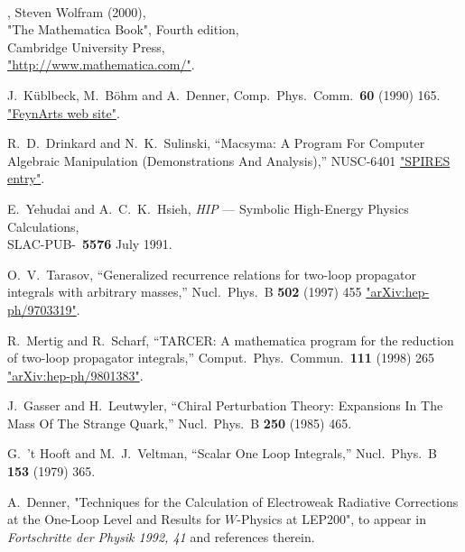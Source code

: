 
~\vspace{3cm}

\begin{thebibliography}{99}

,
Steven Wolfram (2000), \\
"The Mathematica Book", Fourth edition, \\
Cambridge University Press, \\
\href{http://www.mathematica.com/}{"http://www.mathematica.com/"}.

 J.~K\"ublbeck, M.~B\"ohm and A.~Denner, 
Comp.~Phys.~Comm.~{\bf 60} (1990) 165.\\
\href{http://www.feynarts.de/}{"FeynArts web site"}.

R.~D.~Drinkard and N.~K.~Sulinski,
``Macsyma: A Program For Computer Algebraic Manipulation (Demonstrations And Analysis),''
NUSC-6401
\href{http://www.slac.stanford.edu/spires/find/hep/www?r=nusc-6401}{"SPIRES entry"}.

E.~Yehudai and A.~C.~K.~Hsieh,
{\sl HIP\/} --- Symbolic  High-Energy Physics Calculations, \\
SLAC-PUB-~{\bf 5576} July 1991.

O.~V.~Tarasov,
``Generalized recurrence relations for two-loop propagator integrals with  arbitrary masses,''
Nucl.\ Phys.\ B {\bf 502} (1997) 455
\href{http://xxx.lanl.gov/abs/hep-ph/9703319}{"arXiv:hep-ph/9703319"}.

R.~Mertig and R.~Scharf,
``TARCER: A mathematica program for the reduction of two-loop propagator  integrals,''
Comput.\ Phys.\ Commun.\  {\bf 111} (1998) 265
\href{http://xxx.lanl.gov/abs/hep-ph/9801383}{"arXiv:hep-ph/9801383"}.

J.~Gasser and H.~Leutwyler,
``Chiral Perturbation Theory: Expansions In The Mass Of The Strange Quark,''
Nucl.\ Phys.\ B {\bf 250} (1985) 465.

G.~'t Hooft and M.~J.~Veltman,
``Scalar One Loop Integrals,''
Nucl.\ Phys.\ B {\bf 153} (1979) 365.

A.~Denner,  "Techniques for the Calculation of Electroweak 
Radiative Corrections at the One-Loop Level and Results for 
$W$-Physics at LEP200", 
to appear in {\sl Fortschritte der Physik 1992, 41} 
and references therein.


\end{thebibliography}
